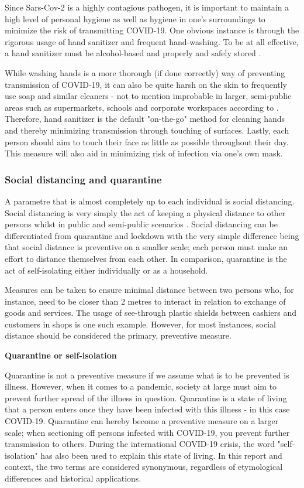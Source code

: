 Since Sars-Cov-2 is a highly contagious pathogen, it is important to maintain a high level of personal hygiene as well as hygiene in one's surroundings to minimize the risk of transmitting COVID-19. One obvious instance is through the rigorous usage of hand sanitizer and frequent hand-washing. To be at all effective, a hand sanitizer must be alcohol-based and properly and safely stored \citep{gharpure_knowledge_2020}.

While washing hands is a more thorough (if done correctly) way of preventing transmission of COVID-19, it can also be quite harsh on the skin to frequently use soap and similar cleaners - not to mention improbable in larger, semi-public areas such as supermarkets, schools and corporate workspaces according to \cite{cavanagh_rational_2020}. Therefore, hand sanitizer is the default "on-the-go" method for cleaning hands and thereby minimizing transmission through touching of surfaces. Lastly, each person should aim to touch their face as little as possible throughout their day. This measure will also aid in minimizing risk of infection via one's own mask.




\subsubsection{Social distancing and quarantine}
A parametre that is almost completely up to each individual is social distancing. Social distancing is very simply the act of keeping a physical distance to other persons whilst in public and semi-public scenarios \citep{ayenigbara_covid-19_2020}. Social distancing can be differentiated from quarantine and lockdown with the very simple difference being that social distance is preventive on a smaller scale; each person must make an effort to distance themselves from each other. In comparison, quarantine is the act of self-isolating either individually or as a household.

Measures can be taken to ensure minimal distance between two persons who, for instance, need to be closer than 2 metres to interact in relation to exchange of goods and services. The usage of see-through plastic shields between cashiers and customers in shops is one such example. However, for most instances, social distance should be considered the primary, preventive measure.




\textbf{Quarantine or self-isolation}

Quarantine is not a preventive measure if we assume what is to be prevented is illness. However, when it comes to a pandemic, society at large must aim to prevent further spread of the illness in question. Quarantine is a state of living that a person enters once they have been infected with this illness - in this case COVID-19. Quarantine can hereby become a preventive measure on a larger scale; when sectioning off persons infected with COVID-19, you prevent further transmission to others. During the international COVID-19 crisis, the word "self-isolation" has also been used to explain this state of living. In this report and context, the two terms are considered synonymous, regardless of etymological differences and historical applications.

